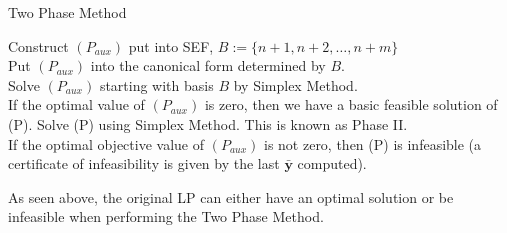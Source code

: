 \begin{algbox}
    \begin{algorithm}[H]
        \caption{Two Phase Method}
        Construct $ (P_{aux}) $ put into SEF, $ B:=\{n+1,n+2,\ldots,n+m\} $\\
        Put $ (P_{aux}) $ into the canonical form determined by $ B $.\\
        Solve $ (P_{aux}) $ starting with basis $ B $ by Simplex Method.\\
        If the optimal value of $ (P_{aux}) $ is zero, then we have a basic
        feasible solution of (P). Solve (P) using Simplex Method. This is
        known as Phase II.\\
        If the optimal objective value of $ (P_{aux}) $ is not zero, then
        (P) is infeasible (a certificate of infeasibility is given by
        the last $ \bm{\bar{y}} $ computed).\\
    \end{algorithm}
\end{algbox}

As seen above, the original LP can either have an optimal
solution or be infeasible when performing the Two Phase Method.

